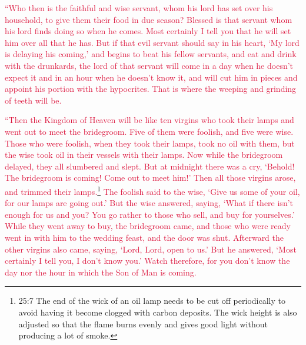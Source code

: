 \myverse{}\textcolor{crimson}{“Who then is the faithful and wise servant, whom his lord
	has set over his household, to give them their food in due season?
}
\myverse{}\textcolor{crimson}{Blessed is that servant whom his lord finds doing so when he comes.
}
\myverse{}\textcolor{crimson}{Most certainly I tell you that he will set him over all that he has.
}
\myverse{}\textcolor{crimson}{But if that evil servant should say in his heart, ‘My lord is delaying
	his coming,’
}
\myverse{}\textcolor{crimson}{and begins to beat his fellow servants, and eat and drink with the drunkards,
}
\myverse{}\textcolor{crimson}{the lord of that servant will come in a day when he doesn’t expect it
	and in an hour when he doesn’t know it,
}
\myverse{}\textcolor{crimson}{and will cut him in pieces and appoint his portion with the hypocrites.
	That is where the weeping and grinding of teeth will be.
}


\mychapter{} \myverse*{}\textcolor{crimson}{“Then the Kingdom of Heaven will be like ten virgins who took
	their lamps and went out to meet the bridegroom.
}
\myverse{}\textcolor{crimson}{Five of them were foolish, and five were wise.
}
\myverse{}\textcolor{crimson}{Those who were foolish, when they took their lamps, took no oil with them,
}
\myverse{}\textcolor{crimson}{but the wise took oil in their vessels with their lamps.
}
\myverse{}\textcolor{crimson}{Now while the bridegroom delayed, they all slumbered and slept.
}
\myverse{}\textcolor{crimson}{But at midnight there was a cry, ‘Behold! The bridegroom is coming! Come
	out to meet him!’
}
\myverse{}\textcolor{crimson}{Then all those virgins arose, and trimmed their lamps.}\footnote{25:7 The end of the wick of an oil lamp needs to be cut off periodically to avoid having it become
	clogged with carbon deposits. The wick height is also adjusted so that the flame burns evenly and gives
	good light without producing a lot of smoke.}
\myverse{}\textcolor{crimson}{The foolish said to the wise, ‘Give us some of your oil, for our lamps
	are going out.’
}
\myverse{}\textcolor{crimson}{But the wise answered, saying, ‘What if there isn’t enough for us and you?
	You go rather to those who sell, and buy for yourselves.’
}
\myverse{}\textcolor{crimson}{While they went away to buy, the bridegroom came, and those who were
	ready went in with him to the wedding feast, and the door was shut.
}
\myverse{}\textcolor{crimson}{Afterward the other virgins also came, saying, ‘Lord, Lord, open to us.’
}
\myverse{}\textcolor{crimson}{But he answered, ‘Most certainly I tell you, I don’t know you.’
}
\myverse{}\textcolor{crimson}{Watch therefore, for you don’t know the day nor the hour in which the
	Son of Man is coming.}

